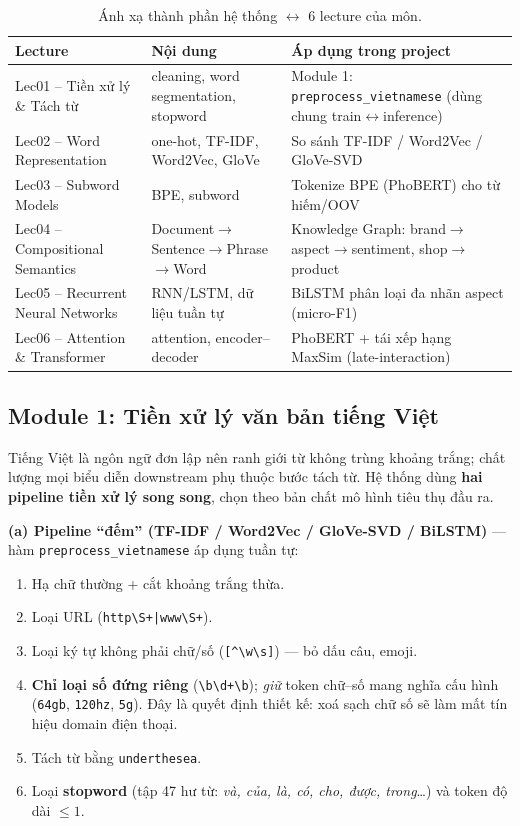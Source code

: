 \documentclass[12pt,a4paper]{article}
\begin{document}
\begin{table}[H]
\centering
\renewcommand{\arraystretch}{1.25}
\begin{tabular}{p{3.4cm}p{4.2cm}p{5.2cm}}
\toprule
\textbf{Lecture} & \textbf{Nội dung} & \textbf{Áp dụng trong project} \\
\midrule
Lec01 -- Tiền xử lý \& Tách từ & cleaning, word segmentation, stopword & Module 1: \texttt{preprocess\_vietnamese} (dùng chung train$\leftrightarrow$inference) \\
Lec02 -- Word Representation & one-hot, TF-IDF, Word2Vec, GloVe & So sánh TF-IDF / Word2Vec / GloVe-SVD \\
Lec03 -- Subword Models & BPE, subword & Tokenize BPE (PhoBERT) cho từ hiếm/OOV \\
Lec04 -- Compositional Semantics & Document$\to$Sentence$\to$Phrase$\to$Word & Knowledge Graph: brand$\to$aspect$\to$sentiment, shop$\to$product \\
Lec05 -- Recurrent Neural Networks & RNN/LSTM, dữ liệu tuần tự & BiLSTM phân loại đa nhãn aspect (micro-F1) \\
Lec06 -- Attention \& Transformer & attention, encoder--decoder & PhoBERT + tái xếp hạng MaxSim (late-interaction) \\
\bottomrule
\end{tabular}
\caption{Ánh xạ thành phần hệ thống $\leftrightarrow$ 6 lecture của môn.}
\end{table}

\subsection{Module 1: Tiền xử lý văn bản tiếng Việt}
\label{sec:module1}

Tiếng Việt là ngôn ngữ đơn lập nên ranh giới từ không trùng khoảng trắng; chất lượng mọi biểu diễn downstream phụ thuộc bước tách từ. Hệ thống dùng \textbf{hai pipeline tiền xử lý song song}, chọn theo bản chất mô hình tiêu thụ đầu ra.

\noindent\textbf{(a) Pipeline ``đếm'' (TF-IDF / Word2Vec / GloVe-SVD / BiLSTM)} --- hàm \texttt{preprocess\_vietnamese} áp dụng tuần tự:
\begin{enumerate}[leftmargin=1.6cm,itemsep=0pt]
  \item Hạ chữ thường + cắt khoảng trắng thừa.
  \item Loại URL (\texttt{http\textbackslash S+|www\textbackslash S+}).
  \item Loại ký tự không phải chữ/số (\texttt{[\textasciicircum\textbackslash w\textbackslash s]}) --- bỏ dấu câu, emoji.
  \item \textbf{Chỉ loại số đứng riêng} (\texttt{\textbackslash b\textbackslash d+\textbackslash b}); \textit{giữ} token chữ--số mang nghĩa cấu hình (\texttt{64gb}, \texttt{120hz}, \texttt{5g}). Đây là quyết định thiết kế: xoá sạch chữ số sẽ làm mất tín hiệu domain điện thoại.
  \item Tách từ bằng \texttt{underthesea}.
  \item Loại \textbf{stopword} (tập 47 hư từ: \textit{và, của, là, có, cho, được, trong}\ldots) và token độ dài $\le 1$.
\end{enumerate}
\end{document}
